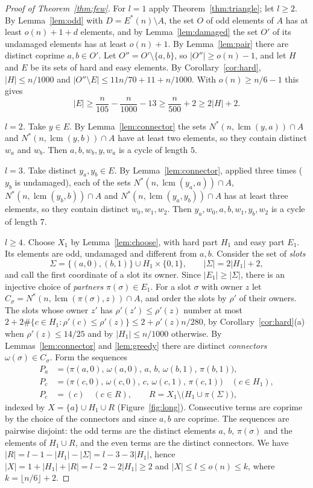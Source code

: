 \documentclass[11pt,a4paper]{article}
\theoremstyle{definition}
\theoremstyle{remark}
\DeclareMathOperator{\lcm}{lcm}
\newcommand{\Es}{E^{*}}
\begin{document}
\begin{proof}[Proof of Theorem~\ref{thm:few}]
For $l=1$ apply Theorem~\ref{thm:triangle}; let $l\ge2$. By Lemma~\ref{lem:odd} with
$D=\Es(n)\setminus A$, the set $O$ of odd elements of $A$ has at least $o(n)+1+d$ elements, and by
Lemma~\ref{lem:damaged} the set $O'$ of its undamaged elements has at least $o(n)+1$. By
Lemma~\ref{lem:pair} there are distinct coprime $a,b\in O'$. Let $O''=O'\setminus\{a,b\}$, so
$|O''|\ge o(n)-1$, and let $H$ and $E$ be its sets of hard and easy elements. By
Corollary~\ref{cor:hard}, $|H|\le n/1000$ and $|O''\setminus E|\le11n/70+11+n/1000$. With
$o(n)\ge n/6-1$ this gives
\[
  |E|\ge\frac n{105}-\frac n{1000}-13\ge\frac n{500}+2\ge2|H|+2 .
\]

\emph{$l=2$.} Take $y\in E$. By Lemma~\ref{lem:connector} the sets $N^*(n,\lcm(y,a))\cap A$ and
$N^*(n,\lcm(y,b))\cap A$ have at least two elements, so they contain distinct $w_a$ and $w_b$. Then
$a,b,w_b,y,w_a$ is a cycle of length $5$.

\emph{$l=3$.} Take distinct $y_a,y_b\in E$. By Lemma~\ref{lem:connector}, applied three times
($y_b$ is undamaged), each of the sets $N^*(n,\lcm(y_a,a))\cap A$, $N^*(n,\lcm(y_b,b))\cap A$ and
$N^*(n,\lcm(y_a,y_b))\cap A$ has at least three elements, so they contain distinct $w_0,w_1,w_2$. Then
$y_a,w_0,a,b,w_1,y_b,w_2$ is a cycle of length $7$.

\emph{$l\ge4$.} Choose $X_1$ by Lemma~\ref{lem:choose}, with hard part $H_1$ and easy part $E_1$. Its
elements are odd, undamaged and different from $a,b$. Consider the set of \emph{slots}
\[
  \Sigma=\{(a,0),(b,1)\}\cup H_1\times\{0,1\},\qquad|\Sigma|=2|H_1|+2 ,
\]
and call the first coordinate of a slot its owner. Since $|E_1|\ge|\Sigma|$, there is an injective
choice of \emph{partners} $\pi(\sigma)\in E_1$. For a slot $\sigma$ with owner $z$ let
$C_\sigma=N^*(n,\lcm(\pi(\sigma),z))\cap A$, and order the slots by $\rho'$ of their owners. The slots
whose owner $z'$ has $\rho'(z')\le\rho'(z)$ number at most $2+2\#\{c\in H_1:\rho'(c)\le\rho'(z)\}\le
2+\rho'(z)n/280$, by Corollary~\ref{cor:hard}(a) when $\rho'(z)\le14/25$ and by $|H_1|\le n/1000$
otherwise. By Lemmas~\ref{lem:connector} and \ref{lem:greedy} there are distinct \emph{connectors}
$\omega(\sigma)\in C_\sigma$. Form the sequences
\begin{align*}
  P_a&=\big(\pi(a,0),\,\omega(a,0),\,a,\,b,\,\omega(b,1),\,\pi(b,1)\big),\\
  P_c&=\big(\pi(c,0),\,\omega(c,0),\,c,\,\omega(c,1),\,\pi(c,1)\big)\quad(c\in H_1),\\
  P_c&=(c)\quad(c\in R),\qquad R=X_1\setminus\big(H_1\cup\pi(\Sigma)\big),
\end{align*}
indexed by $X=\{a\}\cup H_1\cup R$ (Figure~\ref{fig:long}). Consecutive terms are coprime by the
choice of the connectors and since $a,b$ are coprime. The sequences are pairwise disjoint: the odd
terms are the distinct elements $a$, $b$, $\pi(\sigma)$ and the elements of $H_1\cup R$, and the even
terms are the distinct connectors. We have $|R|=l-1-|H_1|-|\Sigma|=l-3-3|H_1|$, hence
$|X|=1+|H_1|+|R|=l-2-2|H_1|\ge2$ and $|X|\le l\le o(n)\le k$, where $k=\lfloor n/6\rfloor+2$.


\end{proof}
\end{document}
